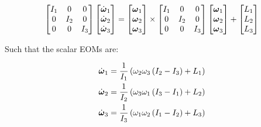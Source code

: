 \begin{equation}
    \begin{bmatrix}
        I_1 & 0 & 0 \\
        0 & I_2 & 0 \\
        0 & 0 & I_3 \\
    \end{bmatrix}
    \begin{bmatrix}
        \dot{\boldsymbol{\omega}}_1 \\
        \dot{\boldsymbol{\omega}}_2 \\
        \dot{\boldsymbol{\omega}}_3 \\
    \end{bmatrix}
    =
    \begin{bmatrix}
        \boldsymbol{\omega}_1 \\
        \boldsymbol{\omega}_2 \\
        \boldsymbol{\omega}_3 \\
    \end{bmatrix}
    \times
    \begin{bmatrix}
        I_1 & 0 & 0 \\
        0 & I_2 & 0 \\
        0 & 0 & I_3 \\
    \end{bmatrix}
    \begin{bmatrix}
        \boldsymbol{\omega}_1 \\
        \boldsymbol{\omega}_2 \\
        \boldsymbol{\omega}_3 \\
    \end{bmatrix}
    +
    \begin{bmatrix}
        L_1 \\
        L_2 \\
        L_3 \\
    \end{bmatrix}
\end{equation}

Such that the scalar EOMs are:

\begin{align*}
    \dot{\boldsymbol{\omega}}_1 &= \frac{1}{I_1} \left(\omega_2 \omega_3 \left(I_2 - I_3\right) + L_1 \right)\\
    \dot{\boldsymbol{\omega}}_2 &= \frac{1}{I_2} \left(\omega_3 \omega_1 \left(I_3 - I_1\right) + L_2 \right)\\
    \dot{\boldsymbol{\omega}}_3 &= \frac{1}{I_3} \left(\omega_1 \omega_2 \left(I_1 - I_2\right) + L_3 \right)\\
\end{align*}


